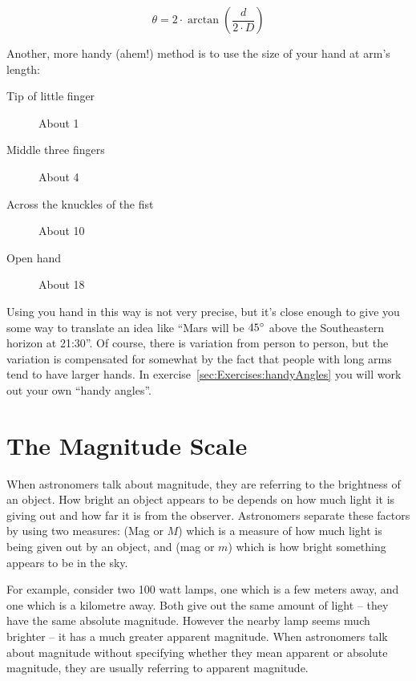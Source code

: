 \begin{equation}
\label{eq:handyAngle}
\theta=2 \cdot \arctan{\left(\frac{d}{2 \cdot D}\right) }
\end{equation}


\noindent Another, more handy (ahem!) method is to use the size of your hand at
arm's length:

\begin{description}
\item[Tip of little finger] About 1\degree 
\item[Middle three fingers] About 4\degree 
\item[Across the knuckles of the fist] About 10\degree 
\item[Open hand] About 18\degree
\end{description}

Using you hand in this way is not very precise, but it's close enough
to give you some way to translate an idea like ``Mars will be
$45\degree$ above the Southeastern horizon at 21:30''. Of course,
there is variation from person to person, but the variation is
compensated for somewhat by the fact that people with long arms tend
to have larger hands. In exercise~\ref{sec:Exercises:handyAngles} you
will work out your own ``handy angles''.



\section{The Magnitude Scale}
\label{sec:Concepts:Magnitudes}


When astronomers talk about magnitude, they are referring to the
brightness of an object. How bright an object appears to be depends on
how much light it is giving out and how far it is from the observer.
Astronomers separate these factors by using two measures:  (Mag or $M$) which is a measure of how much light is being
given out by an object, and  (mag or $m$) which
is how bright something appears to be in the sky.

For example, consider two 100 watt lamps, one which is a few meters
away, and one which is a kilometre away. Both give out the same amount
of light -- they have the same absolute magnitude. However the nearby
lamp seems much brighter -- it has a much greater apparent magnitude.
When astronomers talk about magnitude without specifying whether they
mean apparent or absolute magnitude, they are usually referring to
apparent magnitude.

